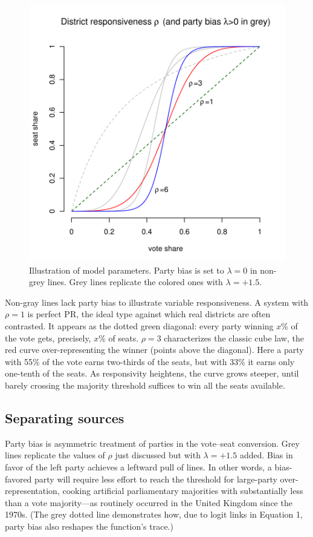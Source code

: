 \documentclass[letter,12pt]{article}
\begin{document}

\begin{figure}
\begin{center}
    \includegraphics[width=.55\columnwidth]{rhoExample.pdf} 
\caption{Illustration of model parameters. Party bias is set to $\lambda=0$ in non-grey lines. Grey lines replicate the colored ones with $\lambda=+1.5$.}\label{F:lambdaRhoEx}
\end{center}
\end{figure}

Non-gray lines lack party bias to illustrate variable responsiveness. A system with $\rho=1$ is perfect PR, the ideal type against which real districts are often contrasted. It appears as the dotted green diagonal: every party winning $x$\% of the vote gets, precisely, $x$\% of seats. $\rho=3$ characterizes the classic cube law, the red curve over-representing the winner (points above the diagonal). Here a party with 55\% of the vote earns two-thirds of the seats, but with 33\% it earns only one-tenth of the seats. As responsivity heightens, the curve grows steeper, until barely crossing the majority threshold suffices to win all the seats available. 

\subsection{Separating sources}

Party bias is asymmetric treatment of parties in the vote--seat conversion. Grey lines replicate the values of $\rho$ just discussed but with $\lambda = +1.5$ added. Bias in favor of the left party achieves a leftward pull of lines. In other words, a bias-favored party will require less effort to reach the threshold for large-party over-representation, cooking artificial parliamentary majorities with substantially less than a vote majority---as routinely occurred in the United Kingdom since the 1970s. (The grey dotted line demonstrates how, due to logit links in Equation 1, party bias also reshapes the function's trace.) %
\end{document}
